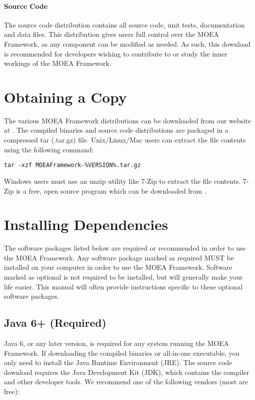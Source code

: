 \paragraph{Source Code}
The source code distribution contains all source code, unit tests, documentation and data files.  This distribution gives users full control over the MOEA Framework, as any component can be modified as needed.  As such, this download is recommended for developers wishing to contribute to or study the inner workings of the MOEA Framework.

\section{Obtaining a Copy}

The various MOEA Framework distributions can be downloaded from our website at .  The compiled binaries and source code distributions are packaged in a compressed tar (.tar.gz) file.  Unix/Linux/Mac users can extract the file contents using the following command:

\begin{lstlisting}[language=Plaintext]
tar -xzf MOEAFramework-%VERSION%.tar.gz
\end{lstlisting}

Windows users must use an unzip utility like 7-Zip to extract the file contents.  7-Zip is a free, open source program which can be downloaded from .

\section{Installing Dependencies}

The software packages listed below are required or recommended in order to use the MOEA Framework.  Any software package marked as required MUST be installed on your computer in order to use the MOEA Framework.  Software marked as optional is not required to be installed, but will generally make your life easier.  This manual will often provide instructions specific to these optional software packages.

\subsection{Java 6+ (Required)}
Java 6, or any later version, is required for any system running the MOEA Framework.  If downloading the compiled binaries or all-in-one executable, you only need to install the Java Runtime Environment (JRE).  The source code download requires the Java Development Kit (JDK), which contains the compiler and other developer tools.  We recommend one of the following vendors (most are free):

